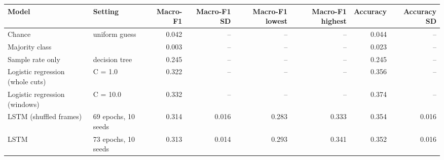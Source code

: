 \begin{tabular}{llrrrrrr}
\toprule
Model & Setting & Macro-F1 & Macro-F1 SD & Macro-F1 lowest & Macro-F1 highest & Accuracy & Accuracy SD \\
\midrule
Chance & uniform guess & 0.042 & -- & -- & -- & 0.044 & -- \\
Majority class &  & 0.003 & -- & -- & -- & 0.023 & -- \\
Sample rate only & decision tree & 0.245 & -- & -- & -- & 0.245 & -- \\
Logistic regression (whole cuts) & C = 1.0 & 0.322 & -- & -- & -- & 0.356 & -- \\
Logistic regression (windows) & C = 10.0 & 0.332 & -- & -- & -- & 0.374 & -- \\
LSTM (shuffled frames) & 69 epochs, 10 seeds & 0.314 & 0.016 & 0.283 & 0.333 & 0.354 & 0.016 \\
LSTM & 73 epochs, 10 seeds & 0.313 & 0.014 & 0.293 & 0.341 & 0.352 & 0.016 \\
\bottomrule
\end{tabular}
